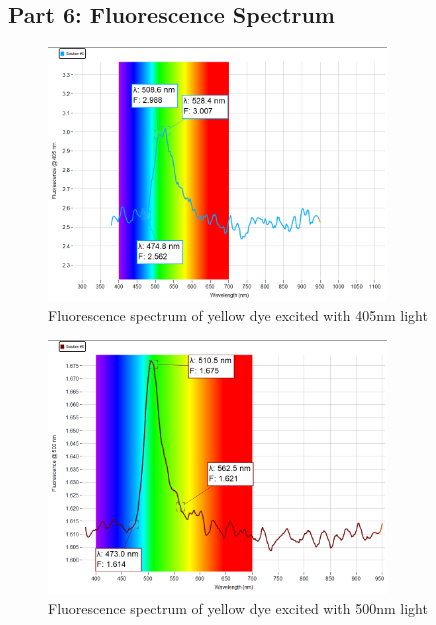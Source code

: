 \subsection{Part 6: Fluorescence Spectrum}
\begin{figure}[H]    \centering
    \includegraphics[width=0.8\textwidth]{Results/fluourescence_spectrometry/405nm.png}
    \caption{Fluorescence spectrum of yellow dye excited with 405nm light}
    \label{fig:fluorescence}
\end{figure}

\begin{figure}[H]    \centering
    \includegraphics[width=0.8\textwidth]{Results/fluourescence_spectrometry/500nm.png}
    \caption{Fluorescence spectrum of yellow dye excited with 500nm light}
    \label{fig:fluorescence2}
\end{figure}
